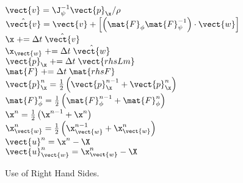 \begin{algorithm}[H]
	$\vect{v} = \J_{\psi}^{-1} \vect{p}_{\x}/\rho$ \\
	$\hat{\vect{v}} = \vect{v} + \left[ \left( \mat{F}_{\phi}\mat{F}_{\psi}^{-1}\right)\cdot\vect{w} \right]$ \\
	$\x \mathrel{{+}{=}} \Delta t \; \hat{\vect{v}}$ \\
	$\x_{\vect{w}} \mathrel{{+}{=}} \Delta t \; \hat{\vect{w}}$ \\
	$\vect{p}_{\x} \mathrel{{+}{=}} \Delta t \; \vect{rhsLm}$ \\
	$\mat{F} \mathrel{{+}{=}} \Delta t \; \mat{rhsF}$ \\
	$\vect{p}_{\x}^n = \frac{1}{2}\left( \vect{p}_{\x}^{n-1} + \vect{p}_{\x}^n \right)$ \\
	$\mat{F}_{\phi}^n = \frac{1}{2}\left( \mat{F}_{\phi}^{n-1} + \mat{F}_{\phi}^n \right)$ \\
	$\x^n = \frac{1}{2}\left( \x^{n-1} + \x^n \right)$ \\
	$\x_{\vect{w}}^n = \frac{1}{2}\left( \x_{\vect{w}}^{n-1} + \x_{\vect{w}}^n \right)$ \\
	$\vect{u}^{n} = \x^n - \X$ \\
	$\vect{u}_{\vect{w}}^{n} = \x_{\vect{w}}^n - \X$
	\caption{Use of Right Hand Sides.}
\end{algorithm}

\bigbreak

%
%
%
